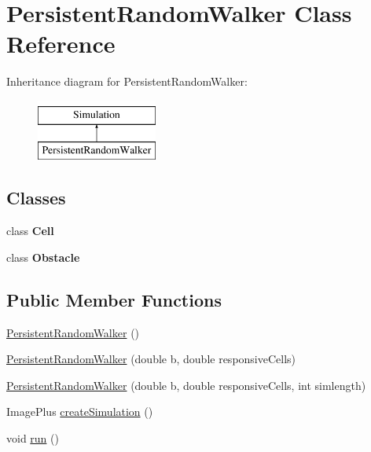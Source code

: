 \hypertarget{classdata_1_1_persistent_random_walker}{}\section{Persistent\+Random\+Walker Class Reference}
\label{classdata_1_1_persistent_random_walker}
Inheritance diagram for Persistent\+Random\+Walker\+:\begin{figure}[H]
\begin{center}
\leavevmode
\includegraphics[height=2.000000cm]{classdata_1_1_persistent_random_walker}
\end{center}
\end{figure}
\subsection*{Classes}
\begin{DoxyCompactItemize}
\item 
class {\bfseries Cell}
\item 
class {\bfseries Obstacle}
\end{DoxyCompactItemize}
\subsection*{Public Member Functions}
\begin{DoxyCompactItemize}
\item 
\hyperlink{classdata_1_1_persistent_random_walker_ad49e0fa12d71d15eb1090e4e77c9f197}{Persistent\+Random\+Walker} ()
\item 
\hyperlink{classdata_1_1_persistent_random_walker_a418219e73f9dc7ff97094ab05696dfa4}{Persistent\+Random\+Walker} (double b, double responsive\+Cells)
\item 
\hyperlink{classdata_1_1_persistent_random_walker_ac0ac741c0140dfde5216dfd1f9c7d4d2}{Persistent\+Random\+Walker} (double b, double responsive\+Cells, int simlength)
\item 
Image\+Plus \hyperlink{classdata_1_1_persistent_random_walker_ad015489397f3b1157e02d08913211ee4}{create\+Simulation} ()
\item 
void \hyperlink{classdata_1_1_persistent_random_walker_a13a43e6d814de94978c515cb084873b1}{run} ()
\end{DoxyCompactItemize}


